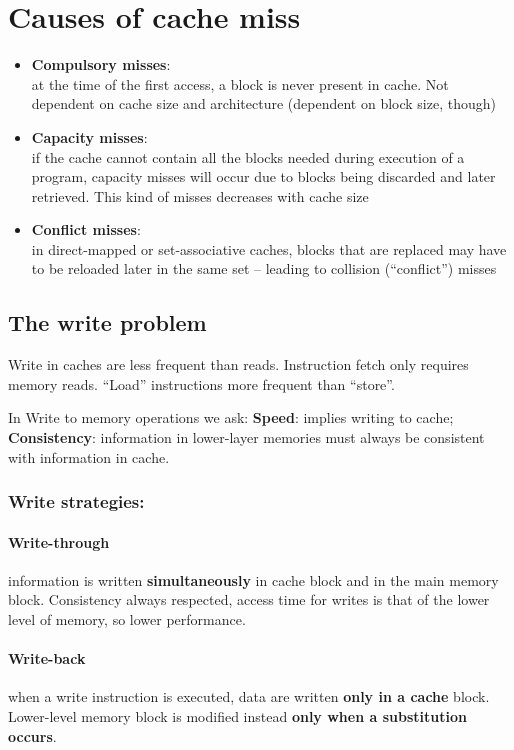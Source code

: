 \section{Causes of cache miss}
\begin{itemize}
    \item \textbf{Compulsory misses}:\\
    at the time of the first access, a block is never present in cache. Not dependent on cache size and architecture (dependent on block size, though)
    \item \textbf{Capacity misses}:\\
    if the cache cannot contain all the blocks needed during execution of a program, capacity misses will occur due to blocks being discarded and later retrieved. This kind of misses decreases with cache size
    \item \textbf{Conflict misses}:\\
    in direct-mapped or set-associative caches, blocks that are replaced may have to be reloaded later in the same set – leading to collision (“conflict”) misses
\end{itemize}

\subsection{The write problem}
Write in caches are less frequent than reads.
Instruction fetch only requires memory reads.
“Load” instructions more frequent than “store”.

In Write to memory operations we ask:
\textbf{Speed}: implies writing to cache;
\textbf{Consistency}: information in lower-layer memories must always be consistent with information in cache.

\subsubsection{Write strategies:}
\paragraph{Write-through}
information is written \textbf{simultaneously} in cache block and in the main memory block. Consistency always respected, access time for writes is that of the lower level of memory, so lower performance.

\paragraph{Write-back}
when a write instruction is executed, data are written \textbf{only in a cache} block. Lower-level memory block is modified instead \textbf{only when a substitution occurs}.

